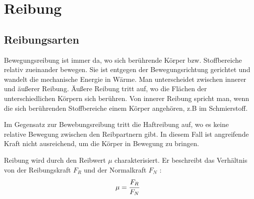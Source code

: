 \section{Reibung}
\label{sec:reibung}

\subsection{Reibungsarten}
\label{sub:reibungsarten}

Bewegungsreibung ist immer da, wo sich berührende Körper bzw. Stoffbereiche relativ zueinander bewegen.
Sie ist entgegen der Bewegungsrichtung gerichtet und wandelt die mechanische Energie in Wärme.
Man unterscheidet zwischen innerer und äußerer Reibung.
Äußere Reibung tritt auf, wo die Flächen der unterschiedlichen Körpern sich berühren.
Von innerer Reibung spricht man, wenn die sich berührenden Stoffbereiche einem Körper angehören, z.B im Schmierstoff.

Im Gegensatz zur Bewebungsreibung tritt die Haftreibung auf, wo es keine relative Bewegung zwischen den Reibpartnern gibt.
In diesem Fall ist angreifende Kraft nicht ausreichend, um die Körper in Bewegung zu bringen.

Reibung wird durch den Reibwert $\mu$ charakterisiert.
Er beschreibt das Verhältnis von der Reibungskraft $F_R$ und der Normalkraft $F_N$ \cite{reibung}:
\begin{equation}
    \label{eq:reibung}
	\mu = \cfrac{F_R}{F_N}
\end{equation}
%

